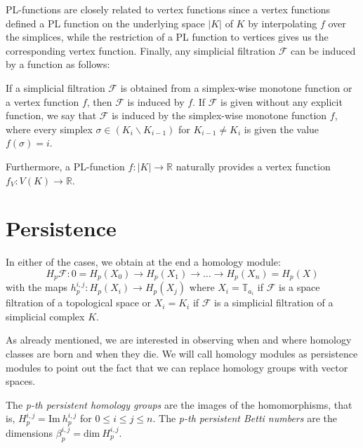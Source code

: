       PL-functions are closely related to vertex functions since a vertex functions defined a PL function on the underlying space $|K|$ of $K$ by interpolating $f$ over the simplices, while the restriction of a PL function to vertices gives us the corresponding vertex function. Finally, any simplicial filtration $\mathcal{F}$ can be induced by a function as follows:

      \begin{definition}
        If a simplicial filtration $\mathcal{F}$ is obtained from a simplex-wise monotone function or a vertex function $f$, then $\mathcal{F}$ is induced by $f$. If $\mathcal{F}$ is given without any explicit function, we say that $\mathcal{F}$ is induced by the simplex-wise monotone function $f$, where every simplex $\sigma \in (K_{i} \backslash K_{i-1})$ for $K_{i-1} \ne K_{i}$ is given the value $f(\sigma) = i$.
      \end{definition}

Furthermore, a PL-function $f: |K| \to \mathbb{R}$ naturally provides a vertex function $f_{V}: V(K) \to \mathbb{R}$.

\section{Persistence}
In either of the cases, we obtain at the end a homology module:
\begin{equation*}
H_{p}\mathcal{F}:0 = H_{p}(X_{0}) \to H_{p}(X_{1}) \to \ldots \to H_{p}(X_{n}) = H_{p}(X)
\end{equation*}
with the maps $h^{i,j}_{p}: H_{p}(X_{i}) \to H_{p}(X_{j})$ where $X_{i} = \mathbb{T}_{a_{i}}$ if $\mathcal{F}$ is a space filtration of a topological space or $X_{i} = K_{i}$ if $\mathcal{F}$ is a simplicial filtration of a simplicial complex $K$.

As already mentioned, we are interested in observing when and where homology classes are born and when they die. We will call homology modules as persistence modules to point out the fact that we can replace homology groups with vector spaces.

\begin{definition}
  The \textit{p-th persistent homology groups} are the images of the homomorphisms, that is, $H^{i,j}_{p} = \text{Im}\:h^{i,j}_{p}$ for $0 \leq i \leq j \leq n$. The \textit{p-th persistent Betti numbers} are the dimensions $\beta^{i,j}_{p} = \text{dim}\:H^{i,j}_{p}$.
\end{definition}

